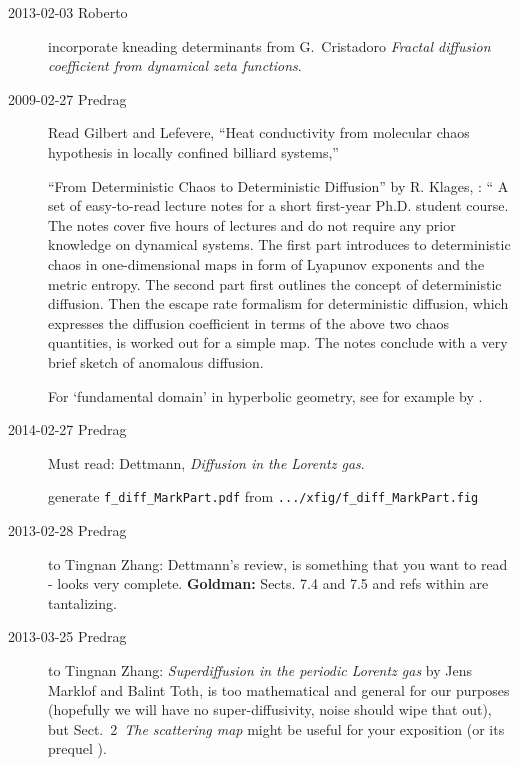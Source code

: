 \documentclass[pre,preprint,groupedaddress,showpacs,showkeys]{revtex4}
\begin{document}
\begin{description}

\item[2013-02-03 Roberto]
incorporate kneading determinants from
G.~Cristadoro
{\em Fractal diffusion coefficient from dynamical zeta functions}.

\item[2009-02-27 Predrag]
Read  Gilbert  and Lefevere,
    ``Heat conductivity from molecular chaos hypothesis
             in locally confined billiard systems,''

``From Deterministic Chaos to Deterministic Diffusion''
by R. Klages, : ``
A set of easy-to-read lecture notes for a short first-year Ph.D.
student course. The notes cover five hours of lectures and
do not require any prior knowledge on dynamical systems. The first part introduces
to deterministic chaos in one-dimensional maps in form of Lyapunov exponents
and the metric entropy. The second part first outlines the concept of
deterministic diffusion. Then the escape rate formalism for deterministic
diffusion, which expresses the diffusion coefficient in terms of the above two
chaos quantities, is worked out for a simple map. The notes conclude with a
very brief sketch of anomalous diffusion.

For `fundamental domain' in hyperbolic geometry, see for example
by .

\item[2014-02-27 Predrag] Must read:
Dettmann, {\em Diffusion in the {Lorentz} gas}.

generate \texttt{f\_diff\_MarkPart.pdf}
from \texttt{.../xfig/f\_diff\_MarkPart.fig}

\item[2013-02-28 Predrag] to Tingnan Zhang:
Dettmann's review,  is something that you want to read -
looks very complete. {\bf Goldman:} Sects. 7.4 and 7.5 and refs within
are tantalizing.

\item[2013-03-25 Predrag] to Tingnan Zhang:
{\em Superdiffusion in the periodic Lorentz gas} by
Jens Marklof and Balint Toth,  	 is too mathematical and
general for our purposes (hopefully we will have no super-diffusivity, noise
should wipe that out), but
Sect.~2~{\em The scattering map} might be useful for your exposition
(or its prequel  ).


\end{description}
\end{document}
